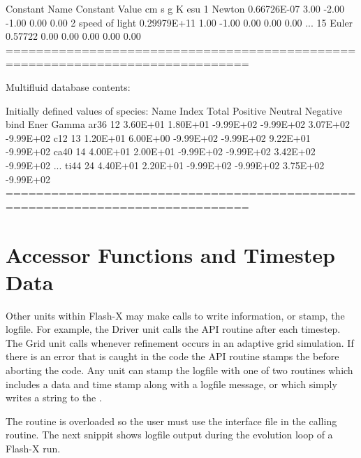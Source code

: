 \begin{codeseg}
    Constant Name       Constant Value   cm        s         g         K         esu
  1              Newton    0.66726E-07   3.00     -2.00     -1.00      0.00      0.00
  2      speed of light    0.29979E+11   1.00     -1.00      0.00      0.00      0.00
 ...
 15               Euler    0.57722       0.00      0.00      0.00      0.00      0.00
 ==============================================================================

 Multifluid database contents:

Initially defined values of species:
Name     Index          Total   Positive  Neutral   Negative  bind Ener Gamma
ar36        12       3.60E+01  1.80E+01 -9.99E+02 -9.99E+02  3.07E+02 -9.99E+02
c12         13       1.20E+01  6.00E+00 -9.99E+02 -9.99E+02  9.22E+01 -9.99E+02
ca40        14       4.00E+01  2.00E+01 -9.99E+02 -9.99E+02  3.42E+02 -9.99E+02
...
ti44        24       4.40E+01  2.20E+01 -9.99E+02 -9.99E+02  3.75E+02 -9.99E+02
 ==============================================================================
\end{codeseg}

\section{Accessor Functions and Timestep Data}
Other units within Flash-X may make calls to write information, or
stamp, the logfile.  For example, the \unit{Driver} unit calls the API
routine  after each timestep.  The
\unit{Grid} unit calls  whenever
refinement occurs in an adaptive grid simulation.  If there is an
error that is caught in the code the API routine
 stamps the  before
aborting the code.  Any unit can stamp the logfile with one of two
routines  which includes a data
and time stamp along with a logfile message, or
 which simply writes a
string to the .

The routine  is overloaded so the user must
use the interface file  in the calling routine.  The next
snippit shows logfile output during the evolution loop of a Flash-X run.

